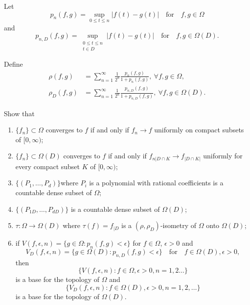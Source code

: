 \begin{exercise}\label{chap4-exer3}
Let
$$
p_{n}(f,g)=\sup\limits_{0\leq t\leq n}|f(t)-g(t)|\quad\text{for}\quad
f,g\in \Omega
$$
and 
$$
p_{n,D}(f,g)=\sup\limits_{\substack{0\leq t\leq n\\ t\in
    D}}|f(t)-g(t)|\quad\text{for}\quad f,g\in \Omega(D).
$$

Define
\begin{align*}
\rho(f,g) &=
\sum^{\infty}_{n=1}\frac{1}{2^{n}}\frac{p_{n}(f,g)}{1+p_{n}(f,g)},\ \forall
f,g\in \Omega,\\
\rho_{D}(f,g) &=
\sum^{\infty}_{n=1}\frac{1}{2^{n}}\frac{p_{n,D}(f,g)}{1+p_{n,D}(f,g)},\ \forall
f,g\in \Omega(D).
\end{align*}


Show that
\begin{enumerate}
\renewcommand{\theenumi}{\roman{enumi}}
\renewcommand{\labelenumi}{(\theenumi)}
\item $\{f_{n}\}\subset \Omega$ converges to $f$ if and only if
  $f_{n}\to f$ uniformly on compact subsets of $[0,\infty)$;

\item $\{f_{n}\}\subset \Omega(D)$ converges to $f$ if and only if
  $f_{n|D\cap K}\to f_{|D\cap K|}$ uniformly for every compact subset
  $K$ of $[0,\infty)$;

\item $\{(P_{1},\ldots,P_{d})\}$\pageoriginale where $P_{i}$ is a
  polynomial with rational coefficients is a countable dense subset of
  $\Omega$; 

\item $\{(P_{1D},\ldots,P_{dD})\}$ is a countable dense subset of
  $\Omega(D)$;

\item $\tau:\Omega\to \Omega(D)$ where $\tau(f)=f_{|D}$ is a
  $(\rho,\rho_{D})$-isometry of $\Omega$ onto $\Omega(D)$;

\item if $V(f,\epsilon,n)=\{g\in \Omega:p_{n}(f,g)<\epsilon\}$ for
  $f\in \Omega$, $\epsilon>0$ and
$$
V_{D}(f,\epsilon,n)=\{g\in\Omega(D):p_{n,D}(f,g)<\epsilon\}\quad\text{for}\quad
f\in \Omega(D), \epsilon>0,
$$
then
$$
\{V(f,\epsilon,n):f\in \Omega,\epsilon>0,n=1,2\ldots\}
$$
is a base for the topology of $\Omega$ and
$$
\{V_{D}(f,\epsilon,n):f\in \Omega(D),\epsilon>0,n=1,2,\ldots\}
$$
is a base for the topology of $\Omega(D)$.
\end{enumerate}
\end{exercise}

